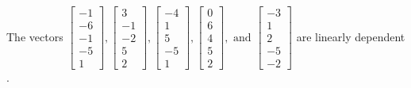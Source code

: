 \begin{exercise}
\begin{exerciseStatement}
  \end{exerciseStatement}
  \begin{exerciseAnswer}
   The vectors \(\left[\begin{array}{r}
-1 \\
-6 \\
-1 \\
-5 \\
1
\end{array}\right] , \left[\begin{array}{r}
3 \\
-1 \\
-2 \\
5 \\
2
\end{array}\right] , \left[\begin{array}{r}
-4 \\
1 \\
5 \\
-5 \\
1
\end{array}\right] , \left[\begin{array}{r}
0 \\
6 \\
4 \\
5 \\
2
\end{array}\right] , \text{ and } \left[\begin{array}{r}
-3 \\
1 \\
2 \\
-5 \\
-2
\end{array}\right]\) are 
  	 linearly dependent  .
  


  \end{exerciseAnswer}
\end{exercise}